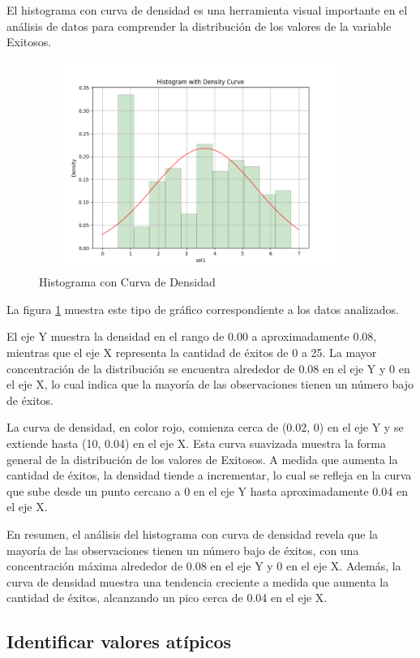 El histograma con curva de densidad es una herramienta visual importante en el
análisis de datos para comprender la distribución de los valores de la variable
Exitosos.

\begin{figure}[htbp]
    \centering
    \includegraphics[width=4.06111in,height=2.68611in]{img/histogramaConCurvaDeDensidad.png}
    \caption{Histograma con Curva de Densidad}
    \label{fig:hist_density}
\end{figure}

La figura \ref{fig:hist_density} muestra este tipo de gráfico correspondiente a
los datos analizados.

El eje Y muestra la densidad en el rango de 0.00 a aproximadamente 0.08,
mientras que el eje X representa la cantidad de éxitos de 0 a 25. La mayor
concentración de la distribución se encuentra alrededor de 0.08 en el eje Y y 0
en el eje X, lo cual indica que la mayoría de las observaciones tienen un
número bajo de éxitos.

La curva de densidad, en color rojo, comienza cerca de (0.02, 0) en el eje Y y
se extiende hasta (10, 0.04) en el eje X. Esta curva suavizada muestra la forma
general de la distribución de los valores de Exitosos. A medida que aumenta la
cantidad de éxitos, la densidad tiende a incrementar, lo cual se refleja en la
curva que sube desde un punto cercano a 0 en el eje Y hasta aproximadamente
0.04 en el eje X.

En resumen, el análisis del histograma con curva de densidad revela que la
mayoría de las observaciones tienen un número bajo de éxitos, con una
concentración máxima alrededor de 0.08 en el eje Y y 0 en el eje X. Además, la
curva de densidad muestra una tendencia creciente a medida que aumenta la
cantidad de éxitos, alcanzando un pico cerca de 0.04 en el eje X.

\subsection{Identificar valores atípicos}

